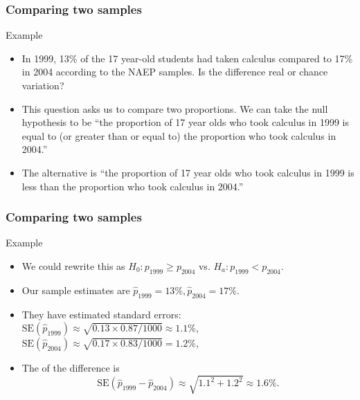 \documentclass[handout]{beamer}
\begin{document}

   \begin{frame} \frametitle{Comparing two samples}

   \begin{block}
   {Example}
   \begin{itemize}
   \item In 1999, 13\% of the 17 year-old students had taken calculus
   compared to 17\% in 2004 according to the NAEP samples.
   Is the difference real or chance variation?

   \item This question asks us to compare two proportions. We can take
   the null hypothesis to be ``the proportion of 17 year olds who took
   calculus in 1999 is equal to (or greater than or equal to) the
   proportion who took calculus in 2004.''

   \item The alternative is ``the proportion of 17 year olds
   who took calculus in 1999 is less than the proportion who took calculus
   in 2004.''
   \end{itemize}
   \end{block}
   \end{frame}


   \begin{frame} \frametitle{Comparing two samples}

   \begin{block}
   {Example}
   \begin{itemize}
   \item We could rewrite this as $H_0: p_{1999} \geq p_{2004}$ vs.
   $H_a:p_{1999} < p_{2004}$.

   \item Our sample estimates are $\widehat{p}_{1999}=13\%, \widehat{p}_{2004}=17\%$.

   \item They have estimated standard errors: $\text{SE}(\widehat{p}_{1999}) \approx \sqrt{0.13 \times 0.87 / 1000} \approx 1.1\%$, $\text{SE}(\widehat{p}_{2004}) \approx \sqrt{0.17 \times 0.83 / 1000} = 1.2\%$,

   \item The  of the difference is
   $$
   \text{SE}(\widehat{p}_{1999} - \widehat{p}_{2004}) \approx \sqrt{1.1^2 + 1.2^2} \approx 1.6\%.
   $$

   \end{itemize}
   \end{block}
   \end{frame}
\end{document}
